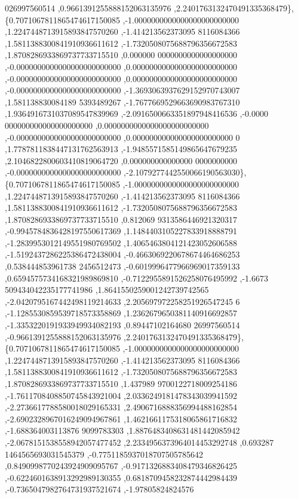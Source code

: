 \begin{DoxyCode}
      026997560514 ,0.9661391255888152063135976 ,2.2401763132470491335368479\},
\{0.7071067811865474617150085 ,-1.0000000000000000000000000 ,1.2247448713915893847570260 ,-1.414213562373095
      8116084366 ,1.5811388300841910936611612 ,-1.7320508075688796356672583 ,1.8708286933869737733715510 ,0.000000
      0000000000000000000 ,-0.0000000000000000000000000 ,0.0000000000000000000000000 ,-0.0000000000000000000000000
       ,0.0000000000000000000000000 ,-0.0000000000000000000000000 ,-1.3693063937629152970743007 ,1.581138830084189
      5393489267 ,-1.7677669529663690983767310 ,1.9364916731037089547839969 ,-2.0916500663351897948416536 ,-0.0000
      000000000000000000000 ,0.0000000000000000000000000 ,-0.0000000000000000000000000 ,0.000000000000000000000000
      0 ,1.7787811838447131762563913 ,-1.9485571585149865647679235 ,2.1046822800603410819064720 ,0.000000000000000
      0000000000 ,-0.0000000000000000000000000 ,-2.1079277442550066190563030\},
\{0.7071067811865474617150085 ,-1.0000000000000000000000000 ,1.2247448713915893847570260 ,-1.414213562373095
      8116084366 ,1.5811388300841910936611612 ,-1.7320508075688796356672583 ,1.8708286933869737733715510 ,0.812069
      9313586446921320317 ,-0.9945784836428197550617369 ,1.1484403105227833918888791 ,-1.2839953012149551980769502
       ,1.4065463804121423052606588 ,-1.5192437286225386472438004 ,-0.4663069220678674464686253 ,0.538444853961738
      2456512473 ,-0.6019996477966969017359133 ,0.6594575734168321989869810 ,-0.7122955891526258076495992 ,-1.6673
      509434042235177741986 ,1.8641550259001242739742565 ,-2.0420795167442498119214633 ,2.205697972258251926547245
      6 ,-1.1285530859539718573358869 ,1.2362679650381140916692857 ,-1.3353220191933949934082193 ,0.89447102164680
      26997560514 ,-0.9661391255888152063135976 ,2.2401763132470491335368479\},
\{0.7071067811865474617150085 ,-1.0000000000000000000000000 ,1.2247448713915893847570260 ,-1.414213562373095
      8116084366 ,1.5811388300841910936611612 ,-1.7320508075688796356672583 ,1.8708286933869737733715510 ,1.437989
      9700122718009254186 ,-1.7611708408850745843921004 ,2.0336249181478343039941592 ,-2.2736617788580018029165331
       ,2.4906716888356994488162854 ,-2.6902328967016249094967861 ,1.4621661175318065861716832 ,-1.688364003113876
      9099783303 ,1.8876483408631481442085942 ,-2.0678151538558942057477452 ,2.2334956373964014453292748 ,0.693287
      1464565693031545379 ,-0.7751185937018707505785642 ,0.8490998770243924909095767 ,-0.9171326883408479346826425
       ,-0.6224601638913292989130355 ,0.6818709458232874442984439 ,-0.7365047982764731937521674 ,-1.97805824824576

\end{DoxyCode}
